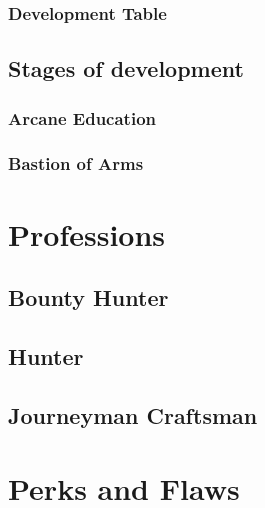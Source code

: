 \documentclass[12pt]{article}
\begin{document}
\subsubsection{Development Table}
\subsection{Stages of development}
\subsubsection{Arcane Education}
\subsubsection{Bastion of Arms}
\section{Professions}
\subsection{Bounty Hunter}
\subsection{Hunter}
\subsection{Journeyman Craftsman}
\section{Perks and Flaws}
\end{document}
